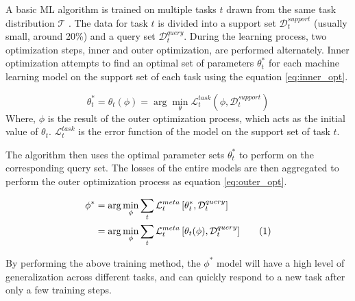 \documentclass[aps,prb,groupedaddress,twocolumn,showpacs,dvipdfmx,superscriptaddress,pdftex]{revtex4-2}
\newcommand\numberthis{\addtocounter{equation}{1}\tag{\theequation}}
\begin{document}
A basic ML algorithm is trained on multiple tasks $t$ drawn from the same task distribution $\mathcal{T}$ \cite{hospedales2021meta}. The data for task $t$ is divided into a support set $\mathcal{D}_t^{support}$ (usually small, around 20\%) and a query set $\mathcal{D}_t^{query}$. During the learning process, two optimization steps, inner and outer optimization, are performed alternately. Inner optimization attempts to find an optimal set of parameters $\theta_t^*$ for each machine learning model on the support set of each task using the equation \ref{eq:inner_opt}.

\begin{equation}
    \theta_t^* = \theta_t(\phi) = \arg\min_{\theta}{\mathcal{L}^{task}_t\left( \phi, \mathcal{D}_t^{support} \right)}
    \label{eq:inner_opt}
\end{equation} Where, $\phi$ is the result of the outer optimization process, which acts as the initial value of $\theta_t$. $\mathcal{L}^{task}_t$ is the error function of the model on the support set of task $t$.

\vspace{2mm}


The algorithm then uses the optimal parameter sets $\theta_t^*$ to perform on the corresponding query set. The losses of the entire models are then aggregated to perform the outer optimization process as equation \ref{eq:outer_opt}.

\begin{align*}
    \phi^* &= \arg\min_{\phi}\sum_{t}{\mathcal{L}^{meta}_t\left[ \theta_t^*, \mathcal{D}_t^{query} \right]}\\
    &= \arg\min_{\phi}\sum_{t}{\mathcal{L}^{meta}_t\left[ \theta_t(\phi), \mathcal{D}_t^{query} \right]} \numberthis
    \label{eq:outer_opt}
\end{align*}


By performing the above training method, the $\phi^*$ model will have a high level of generalization across different tasks, and can quickly respond to a new task after only a few training steps.
\end{document}
